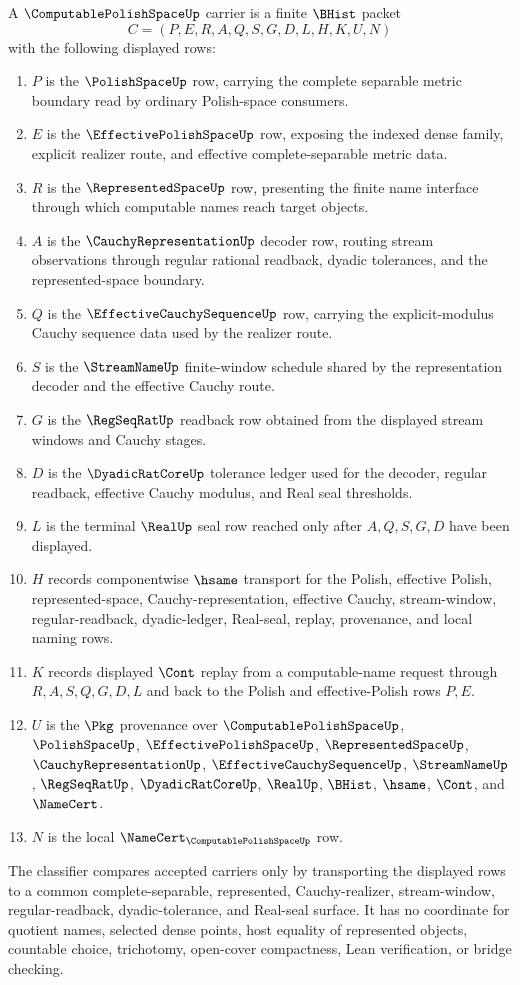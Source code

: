 \begin{definition}\label{def:computable-polish-space-carrier}
A $\ComputablePolishSpaceUp$ carrier is a finite $\BHist$ packet
$$
C=(P,E,R,A,Q,S,G,D,L,H,K,U,N)
$$
with the following displayed rows:
\begin{enumerate}
\item $P$ is the $\PolishSpaceUp$ row, carrying the complete separable metric boundary read by ordinary Polish-space consumers.
\item $E$ is the $\EffectivePolishSpaceUp$ row, exposing the indexed dense family, explicit realizer route, and effective complete-separable metric data.
\item $R$ is the $\RepresentedSpaceUp$ row, presenting the finite name interface through which computable names reach target objects.
\item $A$ is the $\CauchyRepresentationUp$ decoder row, routing stream observations through regular rational readback, dyadic tolerances, and the represented-space boundary.
\item $Q$ is the $\EffectiveCauchySequenceUp$ row, carrying the explicit-modulus Cauchy sequence data used by the realizer route.
\item $S$ is the $\StreamNameUp$ finite-window schedule shared by the representation decoder and the effective Cauchy route.
\item $G$ is the $\RegSeqRatUp$ readback row obtained from the displayed stream windows and Cauchy stages.
\item $D$ is the $\DyadicRatCoreUp$ tolerance ledger used for the decoder, regular readback, effective Cauchy modulus, and Real seal thresholds.
\item $L$ is the terminal $\RealUp$ seal row reached only after $A,Q,S,G,D$ have been displayed.
\item $H$ records componentwise $\hsame$ transport for the Polish, effective Polish, represented-space, Cauchy-representation, effective Cauchy, stream-window, regular-readback, dyadic-ledger, Real-seal, replay, provenance, and local naming rows.
\item $K$ records displayed $\Cont$ replay from a computable-name request through $R,A,S,Q,G,D,L$ and back to the Polish and effective-Polish rows $P,E$.
\item $U$ is the $\Pkg$ provenance over $\ComputablePolishSpaceUp$, $\PolishSpaceUp$, $\EffectivePolishSpaceUp$, $\RepresentedSpaceUp$, $\CauchyRepresentationUp$, $\EffectiveCauchySequenceUp$, $\StreamNameUp$, $\RegSeqRatUp$, $\DyadicRatCoreUp$, $\RealUp$, $\BHist$, $\hsame$, $\Cont$, and $\NameCert$.
\item $N$ is the local $\NameCert_{\ComputablePolishSpaceUp}$ row.
\end{enumerate}
The classifier compares accepted carriers only by transporting the displayed rows to a common complete-separable, represented, Cauchy-realizer, stream-window, regular-readback, dyadic-tolerance, and Real-seal surface. It has no coordinate for quotient names, selected dense points, host equality of represented objects, countable choice, trichotomy, open-cover compactness, Lean verification, or bridge checking.
\end{definition}
